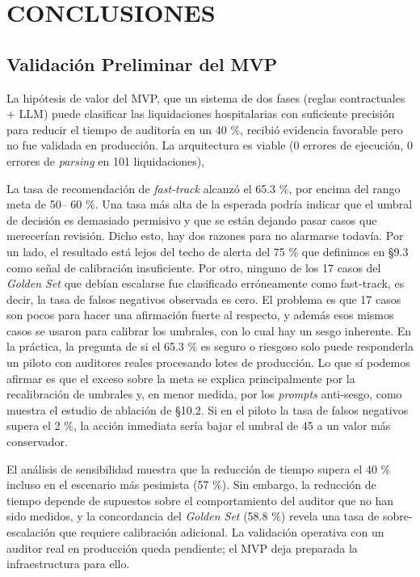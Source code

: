 \chapter{CONCLUSIONES}

\section{Validación Preliminar del MVP}

La hipótesis de valor del MVP, que un sistema de dos fases (reglas contractuales + LLM) puede clasificar las liquidaciones hospitalarias con suficiente precisión para reducir el tiempo de auditoría en un 40 \%, recibió evidencia favorable pero no fue validada en producción. La arquitectura es viable (0 errores de ejecución, 0 errores de \textit{parsing} en 101 liquidaciones),

La tasa de recomendación de \textit{fast-track} alcanzó el 65.3 \%, por encima del rango meta de 50– 60 \%. Una tasa más alta de la esperada podría indicar que el umbral de decisión es demasiado permisivo y que se están dejando pasar casos que merecerían revisión. Dicho esto, hay dos razones para no alarmarse todavía. Por un lado, el resultado está lejos del techo de alerta del 75 \% que definimos en §9.3 como señal de calibración insuficiente. Por otro, ninguno de los 17 casos del \textit{Golden Set} que debían escalarse fue clasificado erróneamente como fast-track, es decir, la tasa de falsos negativos observada es cero. El problema es que 17 casos son pocos para hacer una afirmación fuerte al respecto, y además esos mismos casos se usaron para calibrar los umbrales, con lo cual hay un sesgo inherente. En la práctica, la pregunta de si el 65.3 \% es seguro o riesgoso solo puede responderla un piloto con auditores reales procesando lotes de producción. Lo que sí podemos afirmar es que el exceso sobre la meta se explica principalmente por la recalibración de umbrales y, en menor medida, por los \textit{prompts} anti-sesgo, como muestra el estudio de ablación de §10.2. Si en el piloto la tasa de falsos negativos supera el 2 \%, la acción inmediata sería bajar el umbral de 45 a un valor más conservador.

El análisis de sensibilidad muestra que la reducción de tiempo supera el 40 \% incluso en el escenario más pesimista (57 \%). Sin embargo, la reducción de tiempo depende de supuestos sobre el comportamiento del auditor que no han sido medidos, y la concordancia del \textit{Golden Set} (58.8 \%) revela una tasa de sobre-escalación que requiere calibración adicional. La validación operativa con un auditor real en producción queda pendiente; el MVP deja preparada la infraestructura para ello.

